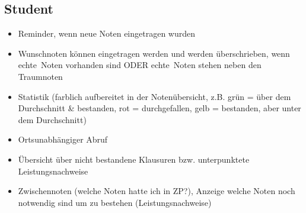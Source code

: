 \documentclass[12pt,a4paper,parskip]{scrreprt}
\begin{document}
\subsection{Student}
\begin{itemize}
\item Reminder, wenn neue Noten eingetragen wurden
\item Wunschnoten können eingetragen werden und werden überschrieben, wenn \glqq echte\grqq\ Noten vorhanden sind ODER \glqq echte\grqq\ Noten stehen neben den Traumnoten
\item Statistik (farblich aufbereitet in der Notenübersicht, z.B. grün = über dem Durchschnitt \& bestanden, rot = durchgefallen, gelb = bestanden, aber unter dem Durchschnitt)
\item Ortsunabhängiger Abruf
\item Übersicht über nicht bestandene Klausuren bzw. unterpunktete Leistungsnachweise
\item Zwischennoten (welche Noten hatte ich in ZP?), Anzeige welche Noten noch notwendig sind um zu bestehen (Leistungsnachweise)
\end{itemize}
\end{document}
